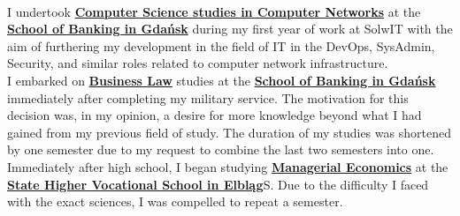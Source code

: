     \begin{rightcolumn}\noindent \small
    \phantom{} \\%
            {I undertook \href{https://www.merito.pl/gdansk/studia-i-szkolenia/studia-i-stopnia/kierunki-i-specjalnosci/informatyka/inzynieria-sieci-komputerowych}{\textbf{Computer Science studies in Computer Networks}} at the \href{https://www.merito.pl/gdansk/}{\textbf{School of Banking in Gdańsk}} during my first year of work at SolwIT with the aim of furthering my development in the field of IT in the DevOps, SysAdmin, Security, and similar roles related to computer network infrastructure.}
        \vspace{\itemspace}\\
            {I embarked on \href{https://www.merito.pl/gdansk/studia-i-szkolenia/studia-i-stopnia/kierunki-i-specjalnosci/prawo-w-biznesie/prawo-i-zarzadzanie}{\textbf{Business Law}} studies at the \href{https://www.merito.pl/gdansk/}{\textbf{School of Banking in Gdańsk}} immediately after completing my military service. The motivation for this decision was, in my opinion, a desire for more knowledge beyond what I had gained from my previous field of study. The duration of my studies was shortened by one semester due to my request to combine the last two semesters into one.}
        \vspace{\itemspace}\\
            {Immediately after high school, I began studying \href{https://ans-elblag.pl/studia-ekonomia-licencjackie.html}{\textbf{Managerial Economics}} at the \href{https://ans-elblag.pl/}{\textbf{State Higher Vocational School in Elbląg}}S. Due to the difficulty I faced with the exact sciences, I was compelled to repeat a semester.}
        \vspace{\sectionspace}
    \end{rightcolumn}%
